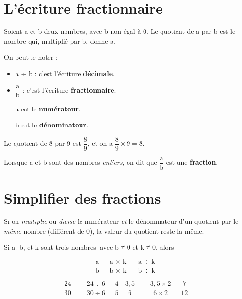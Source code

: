 \documentclass[../€Cours-complet/Cours-complet]{subfiles}
\begin{document}
\maketitleCours

\section{L'écriture fractionnaire}

\begin{cours}
	Soient a et b deux nombres, avec b non égal à 0. Le quotient de a par b est le nombre qui, multiplié par b, donne a.

	On peut le noter :
	\begin{itemize}
		\item a $÷$ b : c'est l'écriture \textbf{décimale}.
		\item $\dfrac{\text{a}}{\text{b}}$ : c'est l'écriture \textbf{fractionnaire}.

		      a est le \textbf{numérateur}.

		      b est le \textbf{dénominateur}.
	\end{itemize}
\end{cours}


\begin{exemple}
	Le quotient de 8 par 9 est $\dfrac{8}{9}$, et on a $\dfrac{8}{9} × 9 = 8$.
\end{exemple}

\begin{cours}[Fractions]
	Lorsque a et b sont des nombres \textit{entiers}, on dit que $\dfrac{\text{a}}{\text{b}}$ est une \textbf{fraction}.
\end{cours}

\section{Simplifier des fractions}

\begin{cours}
	Si on \textit{multiplie} ou \textit{divise} le numérateur \textit{et} le dénominateur d'un quotient par le \textit{même} nombre (différent de 0), la valeur du quotient reste la même.

	Si a, b, et k sont trois nombres, avec b ≠ 0 et k ≠ 0, alors

	$$ \dfrac{\text{a}}{\text{b}} = \dfrac{\text{a × k}}{\text{b × k}} = \dfrac{\text{a }÷\text{ k}}{\text{b }÷\text{ k}} $$
\end{cours}

\begin{exemple}
	\begin{align*}
		\dfrac{24}{30} & = \dfrac{24 ÷ 6}{30 ÷ 6} = \dfrac{4}{5}  &
		\dfrac{3,5}{6} & = \dfrac{3,5 × 2}{6 × 2} = \dfrac{7}{12}
	\end{align*}
\end{exemple}
\end{document}
